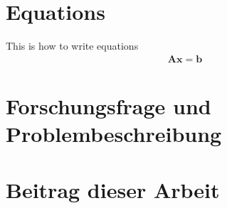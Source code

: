 \section{Equations}
This is how to write equations
\begin{align}
	\bm{A}\bm{x} = \bm{b}
	\label{eq:Equation1}
\end{align}

\section{Forschungsfrage und Problembeschreibung}
\section{Beitrag dieser Arbeit}